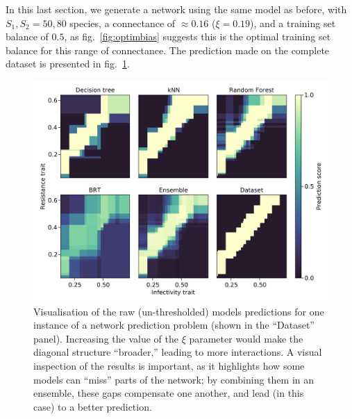 \documentclass[11pt]{article}
\makeatletter
\def\maxwidth{\ifdim\Gin@nat@width>\linewidth\linewidth
\else\Gin@nat@width\fi}
\let\Oldincludegraphics\includegraphics
\renewcommand{\includegraphics}[1]{\Oldincludegraphics[width=\maxwidth]{#1}}
\makeatother
\begin{document}
In this last section, we generate a network using the same model as
before, with \(S_1, S_2 = 50, 80\) species, a connectance of
\(\approx 0.16\) (\(\xi = 0.19\)), and a training set balance of
\(0.5\), as fig.~\ref{fig:optimbias} suggests this is the optimal
training set balance for this range of connectance. The prediction made
on the complete dataset is presented in fig.~\ref{fig:ecovalid}.

\begin{figure}
\hypertarget{fig:ecovalid}{%
\centering
\includegraphics{figures/valid_ensemble.png}
\caption{Visualisation of the raw (un-thresholded) models predictions
for one instance of a network prediction problem (shown in the
``Dataset'' panel). Increasing the value of the \(\xi\) parameter would
make the diagonal structure ``broader,'' leading to more interactions. A
visual inspection of the results is important, as it highlights how some
models can ``miss'' parts of the network; by combining them in an
ensemble, these gaps compensate one another, and lead (in this case) to
a better prediction.}\label{fig:ecovalid}
}
\end{figure}
\end{document}
